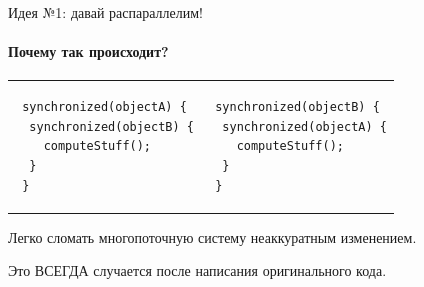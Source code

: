 \begin{frame}[t,fragile]{Идея №1: давай распараллелим!}
\framesubtitle{Почему так происходит?}

\pause

 \begin{tabular}{p{} p{}}
 \begin{verbatim}
 synchronized(objectA) {
  synchronized(objectB) {
    computeStuff();
  }
 }
 \end{verbatim}
 
 & 
 
 \begin{verbatim}
 synchronized(objectB) {
  synchronized(objectA) {
    computeStuff();
  }
 }
 \end{verbatim}
 \end{tabular}

\pause 
Легко сломать многопоточную систему неаккуратным изменением.

\pause
Это ВСЕГДА случается после написания оригинального кода.

\pause


\end{frame}


